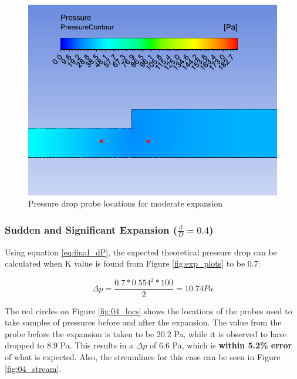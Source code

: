 \begin{figure}[H]
    \centering
    \includegraphics[width=.7\linewidth]{images/task3/06_locations.png}
    \caption{Pressure drop probe locations for moderate expansion}
    \label{fig:06_locs}
\end{figure}


\subsubsection{Sudden and Significant Expansion ($\frac{d}{D} = 0.4$)}

Using equation \ref{eq:final_dP}, the expected theoretical pressure drop can be calculated when K value is found from Figure \ref{fig:exp_plots} to be 0.7:

\[\Delta p = \frac{0.7 * 0.554^2 * 100}{2} = 10.74Pa \]


\noindent The red circles on Figure \ref{fig:04_locs} shows the locations of the probes used to take samples of pressures before and after the expansion. The value from the probe before the expansion is taken to be 20.2 Pa, while it is observed to have dropped to 8.9 Pa. This results in a $\Delta p$ of 6.6 Pa, which is \textbf{within 5.2\% error} of what is expected. Also, the streamlines for this case can be seen in Figure \ref{fig:04_stream}.

